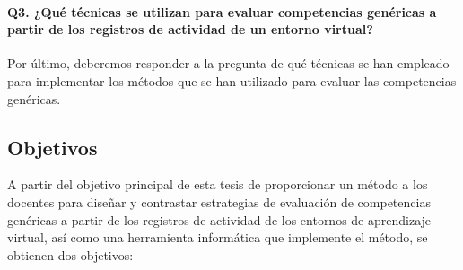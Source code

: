 \paragraph*{Q3. ¿Qué técnicas se utilizan para evaluar competencias genéricas a partir de los registros de actividad de un entorno virtual?}

Por último, deberemos responder a la pregunta de qué técnicas se han empleado para implementar los métodos que se han utilizado para evaluar las competencias genéricas.










\subsection{Objetivos}

A partir del objetivo principal de esta tesis de proporcionar un método a los docentes para diseñar y contrastar estrategias de evaluación de competencias genéricas a partir de los registros de actividad de los entornos de aprendizaje virtual, así como una herramienta informática que implemente el método, se obtienen dos objetivos:
 
